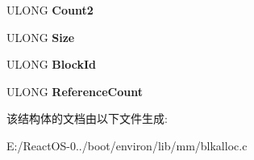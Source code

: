 \begin{DoxyCompactItemize}
U\+L\+O\+NG {\bfseries Count2}
\item 
\mbox{\label{struct___b_l___b_l_o_c_k___d_e_s_c_r_i_p_t_o_r_a469e91129a1bc49410fa1940ac3cd871}} 
U\+L\+O\+NG {\bfseries Size}
\item 
\mbox{\label{struct___b_l___b_l_o_c_k___d_e_s_c_r_i_p_t_o_r_abc7778c67d4711833b1d8ccc06235d1a}} 
U\+L\+O\+NG {\bfseries Block\+Id}
\item 
\mbox{\label{struct___b_l___b_l_o_c_k___d_e_s_c_r_i_p_t_o_r_a605843fa5e870cbff43daea3e0ff4a8b}} 
U\+L\+O\+NG {\bfseries Reference\+Count}
\end{DoxyCompactItemize}


该结构体的文档由以下文件生成\+:\begin{DoxyCompactItemize}
\item 
E\+:/\+React\+O\+S-\/0../boot/environ/lib/mm/blkalloc.\+c\end{DoxyCompactItemize}
